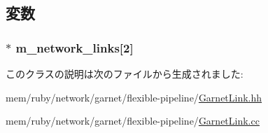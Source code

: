 \subsection{変数}
\hypertarget{classGarnetExtLink_a94c05b942b28036b0b5ae2a8c639f068}{
\subsubsection[{m\_\-network\_\-links}]{$\ast$ {\bf m\_\-network\_\-links}\mbox{[}2\mbox{]}}}
\label{classGarnetExtLink_a94c05b942b28036b0b5ae2a8c639f068}


このクラスの説明は次のファイルから生成されました:\begin{DoxyCompactItemize}
\item 
mem/ruby/network/garnet/flexible-\/pipeline/\hyperlink{GarnetLink_8hh}{GarnetLink.hh}\item 
mem/ruby/network/garnet/flexible-\/pipeline/\hyperlink{GarnetLink_8cc}{GarnetLink.cc}\end{DoxyCompactItemize}
